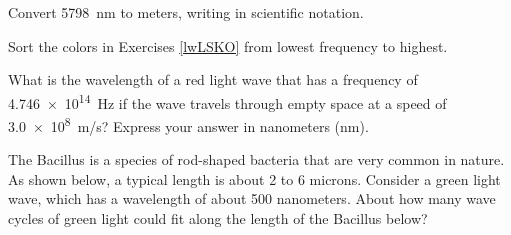 \documentclass[../main-physics-problems.tex]{subfiles}
\begin{document}
\begin{questions}
\begin{center}
\end{center}

\question
Convert \SI{5798}{nm} to meters, writing in scientific notation.


\question
Sort the colors in Exercises \ref{lwLSKO} from lowest frequency to highest.


\question
What is the wavelength of a red light wave that has a frequency of \SI{4.746e14}{\Hz} if the wave travels through empty space at a speed of \SI{3.0e8}{m/s}? Express your answer in nanometers (nm).


\question
The Bacillus is a species of rod-shaped bacteria that are very common in nature. As shown below, a typical length is about 2 to 6 microns. Consider a green light wave, which has a wavelength of about 500 nanometers. About how many wave cycles of green light could fit along the length of the Bacillus below?



\begin{center}


\end{center}
\end{questions}
\end{document}
